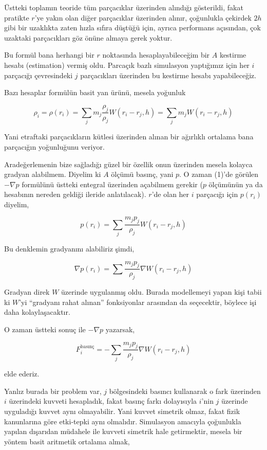 \documentclass[12pt,fleqn]{article}\usepackage{../../common}
\begin{document}
Üstteki toplamın teoride tüm parçacıklar üzerinden alındığı gösterildi, fakat
pratikte $r$'ye yakın olan diğer parçacıklar üzerinden alınır, çoğunlukla
çekirdek $2h$ gibi bir uzaklıkta zaten hızla sıfıra düştüğü için, ayrıca
performans açısından, çok uzaktaki parçacıkları göz önüne almaya gerek yoktur.

Bu formül bana herhangi bir $r$ noktasında hesaplayabileceğim bir $A$ kestirme
hesabı (estimation) vermiş oldu. Parcaçık bazlı simulasyon yaptığımız için her
$i$ parçacığı çevresindeki $j$ parçacıkları üzerinden bu kestirme hesabı
yapabileceğiz.

Bazı hesaplar formülün basit yan ürünü, mesela yoğunluk

$$
\rho_i = \rho(r_i) = \sum_j m_j \frac{\rho_j}{\rho_j} W(r_i-r_j, h) =
\sum_j m_j  W(r_i-r_j, h)
$$

Yani etraftaki parçacıkların kütlesi üzerinden alınan bir ağırlıklı ortalama
bana parçacığın yoğunluğunu veriyor.

Aradeğerlemenin bize sağladığı güzel bir özellik onun üzerinden mesela kolayca
gradyan alabilmem. Diyelim ki $A$ ölçümü basınç, yani $p$. O zaman (1)'de
görülen $-\nabla p$ formülünü üstteki entegral üzerinden açabilmem gerekir ($p$
ölçümünün ya da hesabının nereden geldiği ileride anlatılacak). $r$'de olan her
$i$ parçacığı için $p(r_i)$ diyelim,

$$
p(r_i) = \sum_j \frac{m_j p_j}{\rho_j} W(r_i-r_j,h)
$$

Bu denklemin gradyanını alabiliriz şimdi,

$$
\nabla p(r_i) = \sum \frac{m_j p_j}{\rho_j} \nabla W(r_i-r_j,h)
$$

Gradyan direk $W$ üzerinde uygulanmış oldu. Burada modellemeyi yapan kişi tabii
ki $W$'yi ``gradyanı rahat alınan'' fonksiyonlar arasından da seçecektir,
böylece işi daha kolaylaşacaktır.

O zaman üstteki sonuç ile $-\nabla p$ yazarsak,

$$
F_i^{\textrm{basınç}} = - \sum_j \frac{m_j p_j}{\rho_j} \nabla W(r_i-r_j,h)
$$

elde ederiz.

Yanlız burada bir problem var, $j$ bölgesindeki basıncı kullanarak o fark
üzerinden $i$ üzerindeki kuvveti hesapladık, fakat basınç farkı dolayısıyla
$i$'nin $j$ üzerinde uyguladığı kuvvet aynı olmayabilir. Yani kuvvet simetrik
olmaz, fakat fizik kanunlarına göre etki-tepki aynı olmalıdır. Simulasyon
amacıyla çoğunlukla yapılan dışarıdan müdahele ile kuvveti simetrik hale
getirmektir, mesela bir yöntem basit aritmetik ortalama almak,
\end{document}
